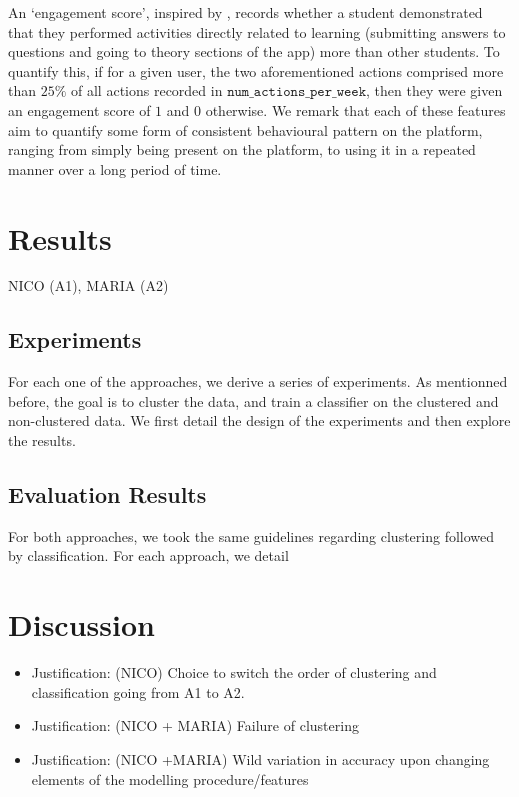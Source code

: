 \documentclass[sigplan,screen]{acmart}
\begin{document}
An `engagement score', inspired by \cite{student_engagement}, records whether a student demonstrated that they performed activities directly related to learning (submitting answers to questions and going to theory sections of the app) more than other students. To quantify this, if for a given user, the two aforementioned actions comprised more than $25\%$ of all actions recorded in $\texttt{num\_actions\_per\_week}$, then they were given an engagement score of $1$ and $0$ otherwise. We remark that each of these features aim to quantify some form of consistent behavioural pattern on the platform, ranging from simply being present on the platform, to using it in a repeated manner over a long period of time. 

\section{Results}\label{sec:results}
{\color{red}NICO (A1), MARIA (A2)}
\subsection{Experiments}\label{subsec:eval}

For each one of the approaches, we derive a series of experiments. As mentionned before, the goal is to cluster the data, and train a classifier on the clustered and non-clustered data. We first detail the design of the experiments and then explore the results.

\subsection{Evaluation Results}\label{subsec:eval_results}

For both approaches, we took the same guidelines regarding clustering followed by classification. For each approach, we detail 

\section{Discussion}\label{sec:discussion}

{\color{red}
\begin{itemize}
\item Justification: (NICO) Choice to switch the order of clustering and classification going from A1 to A2. 
    \item Justification: (NICO + MARIA) Failure of clustering
    \item Justification: (NICO +MARIA) Wild variation in accuracy upon changing elements of the modelling procedure/features
\end{itemize}

}
\end{document}
